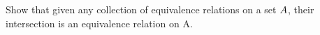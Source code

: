 \documentclass[main.tex]{subfiles}
\begin{document}
\subproblem{}\label{s03p05b}

Show that given any collection of equivalence relations on a set \({A}\),
their intersection is an equivalence relation on A.

\todo{}
\end{document}

